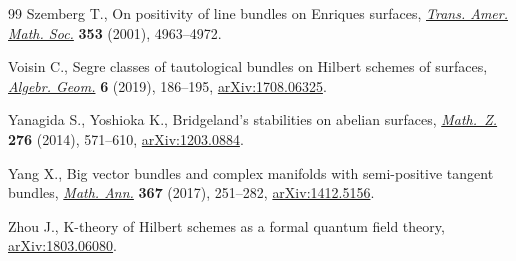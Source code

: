 \begin{thebibliography}{99}
Szemberg T., On positivity of line bundles on {E}nriques surfaces,
 \href{https://doi.org/10.1090/S0002-9947-01-02788-X}{\textit{Trans. Amer. Math. Soc.}} \textbf{353} (2001), 4963--4972.

Voisin C., Segre classes of tautological bundles on {H}ilbert schemes of
 surfaces, \href{https://doi.org/10.14231/AG-2019-010}{\textit{Algebr. Geom.}} \textbf{6} (2019), 186--195,
 \href{https://arxiv.org/abs/1708.06325}{arXiv:1708.06325}.

Yanagida S., Yoshioka K., Bridgeland's stabilities on abelian surfaces,
 \href{https://doi.org/10.1007/s00209-013-1214-1}{\textit{Math.~Z.}} \textbf{276} (2014), 571--610, \href{https://arxiv.org/abs/1203.0884}{arXiv:1203.0884}.

Yang X., Big vector bundles and complex manifolds with semi-positive tangent
 bundles, \href{https://doi.org/10.1007/s00208-016-1382-5}{\textit{Math. Ann.}} \textbf{367} (2017), 251--282,
 \href{https://arxiv.org/abs/1412.5156}{arXiv:1412.5156}.

Zhou J., K-theory of Hilbert schemes as a formal quantum field theory,
 \href{https://arxiv.org/abs/1803.06080}{arXiv:1803.06080}.

\end{thebibliography}
